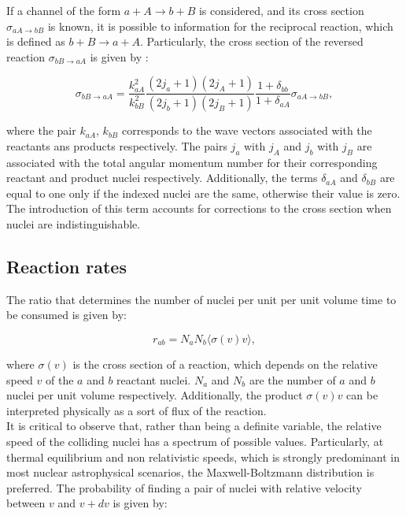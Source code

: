 \documentclass[openany]{book}
\begin{document}
If a channel of the form $a + A \rightarrow b + B$ is considered, and its cross section $\sigma_{aA \rightarrow bB}$ is known, it is possible to information for the reciprocal reaction, which is defined as  $ b + B \rightarrow a + A$. Particularly, the cross section of the reversed reaction $\sigma_{bB \rightarrow aA}$  is given by  \cite{iliadis_2015}:

\begin{equation}\label{eq:nuclearReaction_reciprocal}
	  \sigma_{bB \rightarrow aA} = \frac{k^2_{aA}}{k^2_{bB}} \frac{(2j_a + 1)(2j_A + 1) }{ (2j_b + 1)(2j_B + 1) } \frac{1 + \delta_{bb}}{1 + \delta_{aA}} \sigma_{aA \rightarrow bB} ,  
\end{equation}

where the pair $k_{aA}$, $k_{bB}$ corresponds to the wave vectors associated with the reactants ans products respectively. The pairs $j_a$ with $j_A$ and $j_b$ with $j_B$ are associated with the total angular momentum number for their corresponding reactant and product nuclei respectively. Additionally, the terms $\delta_{aA}$ and  $\delta_{bB}$ are equal to one only if the indexed nuclei are the same, otherwise their value is zero. The introduction of this term accounts for corrections to the cross section when nuclei are indistinguishable. 

\subsection{Reaction rates} \label{sub:reactionRates}

The ratio that determines the number of nuclei per unit per unit volume time to be consumed is given by: 

\begin{equation}  \label{eq:reactionRate_generic}
	r_{ab} = N_aN_b \langle \sigma (v)  v \rangle,
\end{equation}

where $\sigma(v)$ is the cross section of a reaction, which depends on the relative speed $v$ of the $a$ and $b$ reactant nuclei. $N_a$ and $N_b$ are the number of $a$ and $b$ nuclei per unit volume respectively. Additionally, the  product $\sigma (v) v$ can be interpreted physically as a sort of flux of the reaction. \\

It is critical to observe that, rather than being a definite variable, the relative speed of the colliding nuclei has a spectrum of possible values. Particularly, at thermal equilibrium and non relativistic speeds, which is strongly predominant in most nuclear astrophysical scenarios, the Maxwell-Boltzmann distribution is preferred. The probability of finding a pair of nuclei with relative velocity  between $v$ and $v + dv$ is given by:
\end{document}
